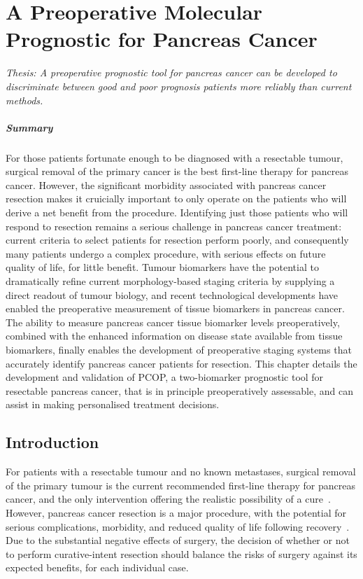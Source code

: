 \documentclass[dissertation.tex]{subfiles}
\begin{document}
\chapter[A Preoperative Molecular Prognostic for Pancreas Cancer][Preoperative Prognosis]{A Preoperative Molecular Prognostic for Pancreas Cancer}
\label{chap:nomogram}

\emph{Thesis: A preoperative prognostic tool for pancreas cancer can be developed to discriminate between good and poor prognosis patients more reliably than current methods.}

\paragraph{Summary}
For those patients fortunate enough to be diagnosed with a resectable tumour, surgical removal of the primary cancer is the best first-line therapy for pancreas cancer.  However, the significant morbidity associated with pancreas cancer resection makes it cruicially important to only operate on the patients who will derive a net benefit from the procedure.  Identifying just those patients who will respond to resection remains a serious challenge in pancreas cancer treatment: current criteria to select patients for resection perform poorly, and consequently many patients undergo a complex procedure, with serious effects on future quality of life, for little benefit.  Tumour biomarkers have the potential to dramatically refine current morphology-based staging criteria by supplying a direct readout of tumour biology, and recent technological developments have enabled the preoperative measurement of tissue biomarkers in pancreas cancer.  The ability to measure pancreas cancer tissue biomarker levels preoperatively, combined with the enhanced information on disease state available from tissue biomarkers, finally enables the development of preoperative staging systems that accurately identify pancreas cancer patients for resection.  This chapter details the development and validation of \gls{PCOP}, a two-biomarker prognostic tool for resectable pancreas cancer, that is in principle preoperatively assessable, and can assist in making personalised treatment decisions.


\section{Introduction}
For patients with a resectable tumour and no known metastases, surgical removal of the primary tumour is the current recommended first-line therapy for pancreas cancer, and the only intervention offering the realistic possibility of a cure~\cite{Editors2015}.  However, pancreas cancer resection is a major procedure, with the potential for serious complications, morbidity, and reduced quality of life following recovery~\cite{Ho2005}.  Due to the substantial negative effects of surgery, the decision of whether or not to perform curative-intent resection should balance the risks of surgery against its expected benefits, for each individual case.
\end{document}
